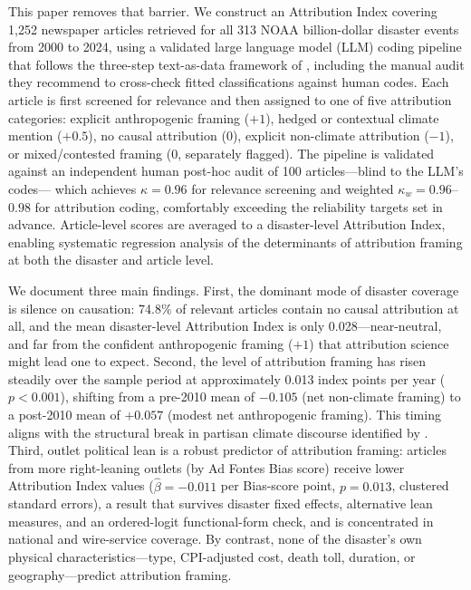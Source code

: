 \documentclass[12pt]{article}
\begin{document}
This paper removes that barrier.  We construct an Attribution Index
covering 1,252 newspaper articles retrieved for all 313 NOAA
billion-dollar disaster events from 2000 to 2024, using a validated
large language model (LLM) coding pipeline that follows the three-step
text-as-data framework of \citet{gentzkow2019}, including the manual
audit they recommend to cross-check fitted classifications against
human codes.  Each article is first
screened for relevance and then assigned to one of five attribution
categories: explicit anthropogenic framing ($+1$), hedged or contextual
climate mention ($+0.5$), no causal attribution ($0$), explicit
non-climate attribution ($-1$), or mixed/contested framing ($0$,
separately flagged).  The pipeline is validated against an independent
human post-hoc audit of 100 articles---blind to the LLM's codes---
which achieves $\kappa = 0.96$ for relevance screening and weighted
$\kappa_w = 0.96$--$0.98$ for attribution coding, comfortably
exceeding the reliability targets set in advance.  Article-level
scores are averaged to a disaster-level Attribution Index, enabling
systematic regression analysis of the determinants of attribution
framing at both the disaster and article level.

We document three main findings.  First, the dominant mode of disaster
coverage is silence on causation: 74.8\% of relevant articles contain
no causal attribution at all, and the mean disaster-level Attribution
Index is only 0.028---near-neutral, and far from the confident
anthropogenic framing ($+1$) that attribution science might lead one
to expect.  Second, the level of attribution framing has risen
steadily over the sample period at approximately 0.013 index points
per year ($p < 0.001$), shifting from a pre-2010 mean of $-0.105$
(net non-climate framing) to a post-2010 mean of $+0.057$ (modest net
anthropogenic framing).  This timing aligns with the structural break
in partisan climate discourse identified by \citet{chinn2020}.  Third,
outlet political lean is a robust predictor of attribution framing:
articles from more right-leaning outlets (by Ad Fontes Bias score)
receive lower Attribution Index values ($\hat\beta = -0.011$ per
Bias-score point, $p = 0.013$, clustered standard errors), a result
that survives disaster fixed effects, alternative lean measures, and an
ordered-logit functional-form check, and is concentrated in national
and wire-service coverage.  By contrast, none of the disaster's own
physical characteristics---type, CPI-adjusted cost, death toll,
duration, or geography---predict attribution framing.
\end{document}
